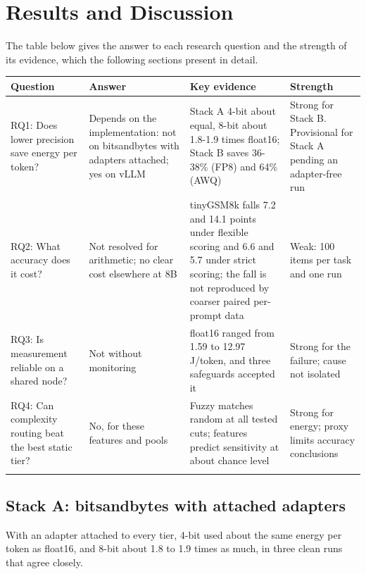 \chapter{Results and Discussion}
The table below gives the answer to each research question and the strength of its evidence, which the following sections present in detail.


\begingroup\footnotesize\setlength{\tabcolsep}{4pt}
\begin{longtable}{>{\raggedright\arraybackslash}p{30.9mm}>{\raggedright\arraybackslash}p{38.3mm}>{\raggedright\arraybackslash}p{36.4mm}>{\raggedright\arraybackslash}p{33.2mm}}
\toprule
\textbf{Question} & \textbf{Answer} & \textbf{Key evidence} & \textbf{Strength} \\
\midrule
\endhead
RQ1: Does lower precision save energy per token? & Depends on the implementation: not on bitsandbytes with adapters attached; yes on vLLM & Stack A 4-bit about equal, 8-bit about 1.8-1.9 times float16; Stack B saves 36-38\% (FP8) and 64\% (AWQ) & Strong for Stack B. Provisional for Stack A pending an adapter-free run \\*
RQ2: What accuracy does it cost? & Not resolved for arithmetic; no clear cost elsewhere at 8B & tinyGSM8k falls 7.2 and 14.1 points under flexible scoring and 6.6 and 5.7 under strict scoring; the fall is not reproduced by coarser paired per-prompt data & Weak: 100 items per task and one run \\*
RQ3: Is measurement reliable on a shared node? & Not without monitoring & float16 ranged from 1.59 to 12.97 J/token, and three safeguards accepted it & Strong for the failure; cause not isolated \\*
RQ4: Can complexity routing beat the best static tier? & No, for these features and pools & Fuzzy matches random at all tested cuts; features predict sensitivity at about chance level & Strong for energy; proxy limits accuracy conclusions \\*
\bottomrule\noalign{\nobreak}
\end{longtable}
\addtocounter{table}{-1}
\endgroup

\section{Stack A: bitsandbytes with attached adapters}
With an adapter attached to every tier, 4-bit used about the same energy per token as float16, and 8-bit about 1.8 to 1.9 times as much, in three clean runs that agree closely.


